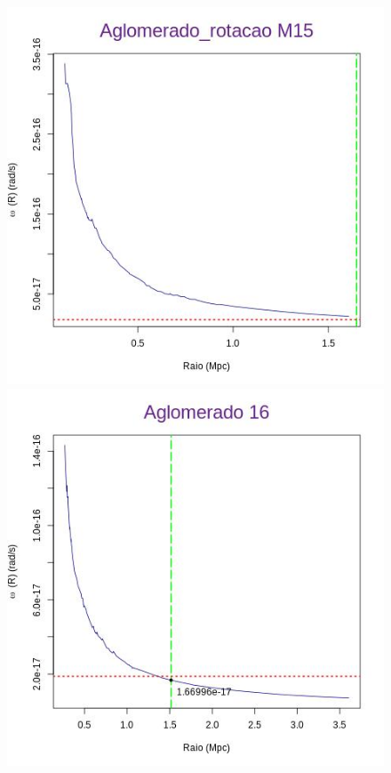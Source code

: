 \begin{anexosenv}
\begin{figure}[H]
\begin{center}
\includegraphics[scale=.3]{04-figuras/selec20/perfil15}
\includegraphics[scale=.3]{04-figuras/selec20/perfil16}\hfill

\end{center}
\end{figure}
\end{anexosenv}

